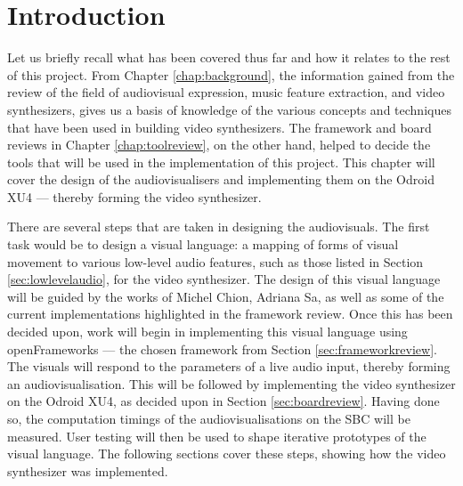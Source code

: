 \documentclass[../initial_thesis.tex]{subfiles}
\begin{document}
\section{Introduction}


Let us briefly recall what has been covered thus far and how it relates to the rest of this project. From Chapter \ref{chap:background}, the information gained from the review of the field of audiovisual expression, music feature extraction, and video synthesizers, gives us a basis of knowledge of the various concepts and techniques that have been used in building video synthesizers. The framework and board reviews in Chapter \ref{chap:toolreview}, on the other hand, helped to decide the tools that will be used in the implementation of this project. This chapter will cover the design of the audiovisualisers and implementing them on the Odroid XU4 --- thereby forming the video synthesizer. \par

There are several steps that are taken in designing the audiovisuals. The first task would be to design a visual language: a mapping of forms of visual movement to various low-level audio features, such as those listed in Section \ref{sec:lowlevelaudio}, for the video synthesizer. The design of this visual language will be guided by the works of Michel Chion, Adriana Sa, as well as some of the current implementations highlighted in the framework review. Once this has been decided upon, work will begin in implementing this visual language using openFrameworks --- the chosen framework from Section \ref{sec:frameworkreview}. The visuals will respond to the parameters of a live audio input, thereby forming an audiovisualisation. This will be followed by implementing the video synthesizer on the Odroid XU4, as decided upon in Section \ref{sec:boardreview}. Having done so, the computation timings of the audiovisualisations on the SBC will be measured. User testing will then be used to shape iterative prototypes of the visual language. The following sections cover these steps, showing how the video synthesizer was implemented.
\end{document}
